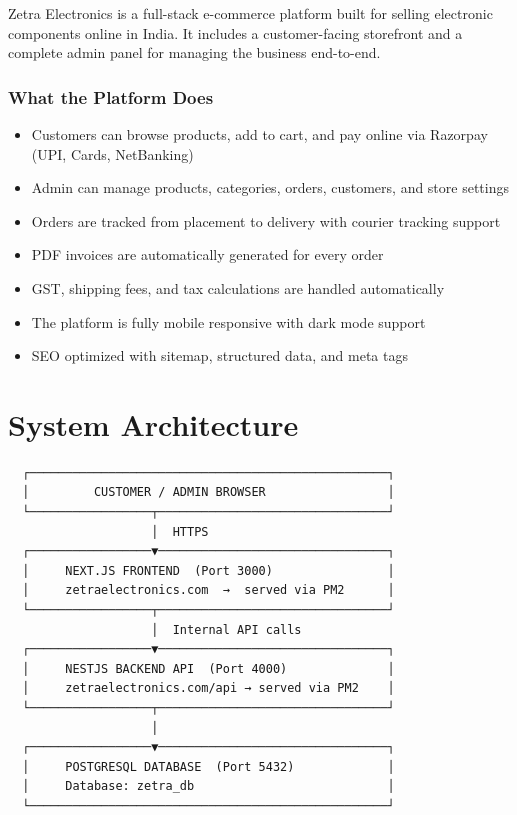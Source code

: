 \documentclass[12pt,a4paper]{article}
\begin{document}
Zetra Electronics is a full-stack e-commerce platform built for selling electronic components online in India. It includes a customer-facing storefront and a complete admin panel for managing the business end-to-end.

\subsubsection{What the Platform Does}
\begin{itemize}[leftmargin=1.5em, itemsep=4pt]
  \item Customers can browse products, add to cart, and pay online via Razorpay (UPI, Cards, NetBanking)
  \item Admin can manage products, categories, orders, customers, and store settings
  \item Orders are tracked from placement to delivery with courier tracking support
  \item PDF invoices are automatically generated for every order
  \item GST, shipping fees, and tax calculations are handled automatically
  \item The platform is fully mobile responsive with dark mode support
  \item SEO optimized with sitemap, structured data, and meta tags
\end{itemize}

\section{System Architecture}

\begin{archbox}
\color{white}\ttfamily\small
\begin{verbatim}
  ┌──────────────────────────────────────────────────┐
  │         CUSTOMER / ADMIN BROWSER                 │
  └─────────────────┬────────────────────────────────┘
                    │  HTTPS
  ┌─────────────────▼────────────────────────────────┐
  │     NEXT.JS FRONTEND  (Port 3000)                │
  │     zetraelectronics.com  →  served via PM2      │
  └─────────────────┬────────────────────────────────┘
                    │  Internal API calls
  ┌─────────────────▼────────────────────────────────┐
  │     NESTJS BACKEND API  (Port 4000)              │
  │     zetraelectronics.com/api → served via PM2    │
  └─────────────────┬────────────────────────────────┘
                    │
  ┌─────────────────▼────────────────────────────────┐
  │     POSTGRESQL DATABASE  (Port 5432)             │
  │     Database: zetra_db                           │
  └──────────────────────────────────────────────────┘
\end{verbatim}
\end{archbox}
\end{document}
